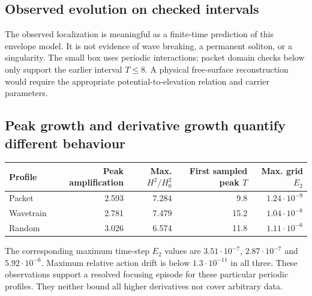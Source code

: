 \subsection{Observed evolution on checked intervals}
The observed localization is meaningful as a finite-time prediction of this envelope model. It is not evidence of wave breaking, a permanent soliton, or a singularity. The small box uses periodic interactions; packet domain checks below only support the earlier interval $T\le8$. A physical free-surface reconstruction would require the appropriate potential-to-elevation relation and carrier parameters.
\clearpage
\subsection{Peak growth and derivative growth quantify different behaviour}
\begin{center}\small
\begin{tabular}{lrrrr}\toprule
Profile & Peak amplification & Max. $H^2/H^2_0$ & First sampled peak $T$ & Max. grid $E_2$ \\\midrule
Packet & 2.593 & 7.284 & 9.8 & $1.24\cdot10^{-9}$ \\
Wavetrain & 2.781 & 7.479 & 15.2 & $1.04\cdot10^{-8}$ \\
Random & 3.026 & 6.574 & 11.8 & $1.11\cdot10^{-6}$ \\\bottomrule
\end{tabular}
\end{center}
The corresponding maximum time-step $E_2$ values are $3.51\cdot10^{-7}$, $2.87\cdot10^{-7}$ and $5.92\cdot10^{-6}$. Maximum relative action drift is below $1.3\cdot10^{-11}$ in all three. These observations support a resolved focusing episode for these particular periodic profiles. They neither bound all higher derivatives nor cover arbitrary data.

